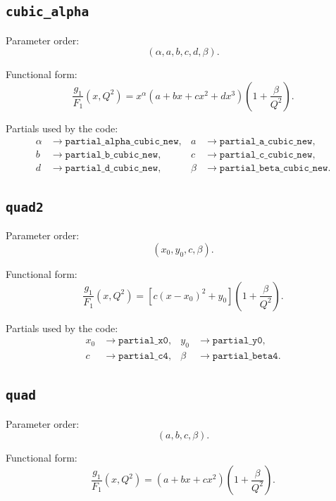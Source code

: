 \documentclass[11pt]{article}
\begin{document}
\subsection{\texttt{cubic\_alpha}}

Parameter order:
\[
(\alpha, a, b, c, d, \beta).
\]

Functional form:
\begin{equation}
\frac{g_1}{F_1}(x,Q^2)
=
x^\alpha (a + bx + cx^2 + dx^3)\left(1 + \frac{\beta}{Q^2}\right).
\end{equation}

Partials used by the code:
\begin{align*}
\alpha &\rightarrow \texttt{partial\_alpha\_cubic\_new}, &
a      &\rightarrow \texttt{partial\_a\_cubic\_new}, \\
b      &\rightarrow \texttt{partial\_b\_cubic\_new}, &
c      &\rightarrow \texttt{partial\_c\_cubic\_new}, \\
d      &\rightarrow \texttt{partial\_d\_cubic\_new}, &
\beta  &\rightarrow \texttt{partial\_beta\_cubic\_new}.
\end{align*}

\subsection{\texttt{quad2}}

Parameter order:
\[
(x_0, y_0, c, \beta).
\]

Functional form:
\begin{equation}
\frac{g_1}{F_1}(x,Q^2)
=
\left[c(x-x_0)^2 + y_0\right]\left(1+\frac{\beta}{Q^2}\right).
\end{equation}

Partials used by the code:
\begin{align*}
x_0   &\rightarrow \texttt{partial\_x0}, &
y_0   &\rightarrow \texttt{partial\_y0}, \\
c     &\rightarrow \texttt{partial\_c4}, &
\beta &\rightarrow \texttt{partial\_beta4}.
\end{align*}

\subsection{\texttt{quad}}

Parameter order:
\[
(a, b, c, \beta).
\]

Functional form:
\begin{equation}
\frac{g_1}{F_1}(x,Q^2)
=
(a + bx + cx^2)\left(1+\frac{\beta}{Q^2}\right).
\end{equation}
\end{document}
